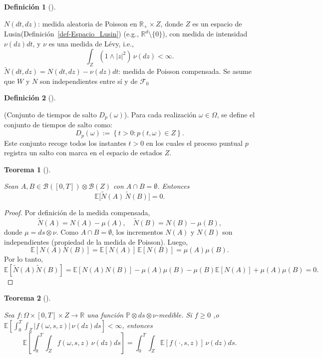 \documentclass[
  spanish,
  us-letterpaper,
]{scrreprt}
\theoremstyle{plain}
\newtheorem{theorem}{Teorema}[chapter]
\theoremstyle{plain}
\theoremstyle{definition}
\newtheorem{definition}{Definición}[chapter]
\theoremstyle{remark}
\begin{document}
\begin{definition}[]\protect\hypertarget{def-med_alea_poisson}{}\label{def-med_alea_poisson}

\(N(dt,dz)\): medida aleatoria de Poisson en \(\mathbb{R}_+ \times Z\),
donde \(Z\) es un espacio de Lusin(Definición~\ref{def-Espacio_Lusin})
(e.g., \(\mathbb{R}^d \setminus \{0\}\)), con medida de intensidad
\(\nu(dz)dt\), y \(\nu\) es una medida de Lévy, i.e.,
\[\int_Z (1 \wedge |z|^2)\,\nu(dz) < \infty.\]
\(\tilde{N}(dt,dz) = N(dt,dz) - \nu(dz)dt\): medida de Poisson
compensada. Se asume que \(W\) y \(N\) son independientes entre sí y de
\(\mathcal{F}_0\)

\end{definition}

\begin{definition}[]\protect\hypertarget{def-1}{}\label{def-1}

(Conjunto de tiempos de salto \(D_p(\omega)\)). Para cada realización
\(\omega \in \Omega\), se define el conjunto de tiempos de salto como:
\[D_p(\omega) := \left\{ t > 0 : p(t, \omega) \in Z \right\}.\] Este
conjunto recoge todos los instantes \(t > 0\) en los cuales el proceso
puntual \(p\) registra un salto con marca en el espacio de estados
\(Z\).

\end{definition}

\begin{theorem}[]\protect\hypertarget{thm-orto_mo_corre}{}\label{thm-orto_mo_corre}

Sean \(A, B \in \mathcal{B}([0,T]) \otimes \mathcal{B}(Z)\) con
\(A \cap B = \emptyset\). Entonces
\[\mathbb{E}\big[ \widetilde{N}(A) \, \widetilde{N}(B) \big] = 0.\]

\end{theorem}

\begin{proof}
Por definición de la medida compensada,
\[\widetilde{N}(A) = N(A) - \mu(A), \quad \widetilde{N}(B) = N(B) - \mu(B),\]
donde \(\mu = ds \otimes \nu\). Como \(A \cap B = \emptyset\), los
incrementos \(N(A)\) y \(N(B)\) son independientes (propiedad de la
medida de Poisson). Luego,
\[\mathbb{E}[N(A) N(B)] = \mathbb{E}[N(A)] \, \mathbb{E}[N(B)] = \mu(A) \mu(B).\]
Por lo tanto,
\[\mathbb{E}[\widetilde{N}(A) \widetilde{N}(B)] = \mathbb{E}[N(A)N(B)] - \mu(A)\mu(B) - \mu(B)\mathbb{E}[N(A)] + \mu(A)\mu(B) = 0.\]
\end{proof}

\begin{theorem}[]\protect\hypertarget{thm-Fubinni_esperanzas}{}\label{thm-Fubinni_esperanzas}

Sea \(f : \Omega \times [0,T] \times Z \to \mathbb{R}\) una función
\(\mathbb{P} \otimes ds \otimes \nu\)-medible. Si \(f \geq 0\) ,o
\(\mathbb{E}\!\left[ \int_0^T \int_Z |f(\omega,s,z)| \, \nu(dz) ds \right] < \infty\),
entonces
\[\mathbb{E}\!\left[ \int_0^T \int_Z f(\omega,s,z) \, \nu(dz) ds \right] = \int_0^T \int_Z \mathbb{E}[f(\cdot,s,z)] \, \nu(dz) ds.\]

\end{theorem}
\end{document}

